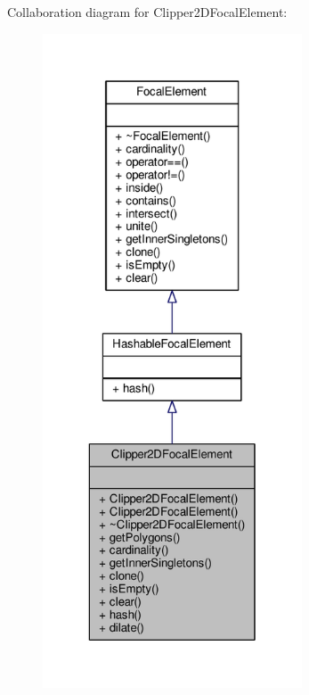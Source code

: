 Collaboration diagram for Clipper2\+D\+Focal\+Element\+:\nopagebreak
\begin{figure}[H]
\begin{center}
\leavevmode
\includegraphics[height=550pt]{classClipper2DFocalElement__coll__graph}
\end{center}
\end{figure}
